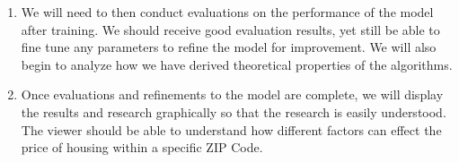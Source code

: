 \begin{enumerate}
    \item We will need to then conduct evaluations on the performance of the model after training. We should receive good evaluation results, yet still be able to fine tune any parameters to refine the model for improvement. We will also begin to analyze how we have derived theoretical properties of the algorithms.
    
    \item Once evaluations and refinements to the model are complete, we will display the results and research graphically so that the research is easily understood. The viewer should be able to understand how different factors can effect the price of housing within a specific ZIP Code. 
\end{enumerate}